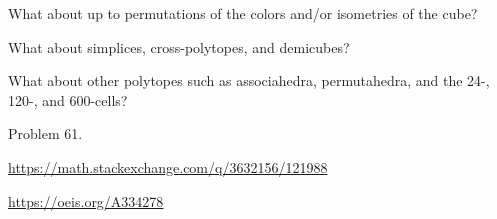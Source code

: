 \documentclass{article}
\begin{document}
\begin{related}
  \item What about up to permutations of the colors and/or isometries of the cube?
  \item What about simplices, cross-polytopes, and demicubes?
  \item What about other polytopes such as associahedra, permutahedra, and
    the 24-, 120-, and 600-cells?
\end{related}

\begin{references}
  \item Problem 61.
  \item \url{https://math.stackexchange.com/q/3632156/121988}
  \item \url{https://oeis.org/A334278}
\end{references}
\end{document}
